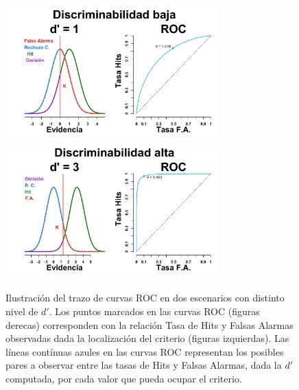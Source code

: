 \begin{figure}[th]
\centering
\includegraphics[width=0.75\textwidth]{Figures/ROC_2} \\
\includegraphics[width=0.75\textwidth]{Figures/ROC_3}\\
\caption[Trazo de curvas ROC]{Ilustración del trazo de curvas ROC en dos escenarios con distinto nivel de $d'$. Los puntos marcados en las curvas ROC (figuras derecas) corresponden con la relación Tasa de Hits y Falsas Alarmas observadas dada la localización del criterio (figuras izquierdas). Las líneas contínuas azules en las curvas ROC representan los posibles pares a observar entre las tasas de Hits y Falsas Alarmas, dada la $d'$ computada, por cada valor que pueda ocupar el criterio.}
\label{fig:Graf_ROC}
\end{figure}


